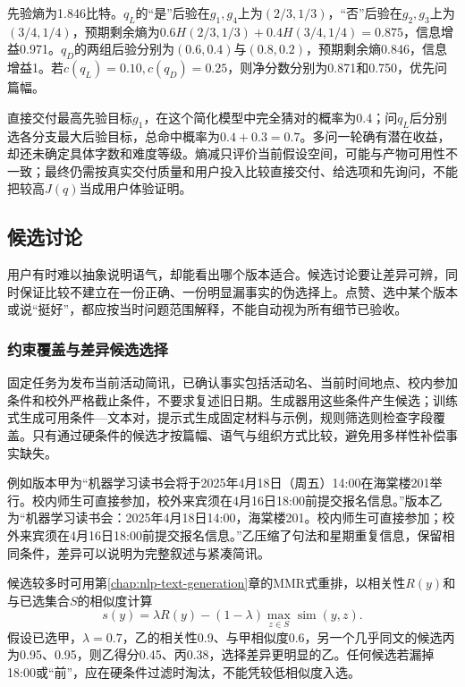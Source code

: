 先验熵为1.846比特。$q_L$的“是”后验在$g_1,g_4$上为$(2/3,1/3)$，“否”后验在$g_2,g_3$上为$(3/4,1/4)$，预期剩余熵为$0.6H(2/3,1/3)+0.4H(3/4,1/4)=0.875$，信息增益0.971。$q_D$的两组后验分别为$(0.6,0.4)$与$(0.8,0.2)$，预期剩余熵0.846，信息增益1。若$c(q_L)=0.10,c(q_D)=0.25$，则净分数分别为0.871和0.750，优先问篇幅。

直接交付最高先验目标$g_1$，在这个简化模型中完全猜对的概率为0.4；问$q_L$后分别选各分支最大后验目标，总命中概率为$0.4+0.3=0.7$。多问一轮确有潜在收益，却还未确定具体字数和难度等级。熵减只评价当前假设空间，可能与产物可用性不一致；最终仍需按真实交付质量和用户投入比较直接交付、给选项和先询问，不能把较高$J(q)$当成用户体验证明。

\subsection{候选讨论}
\label{sec:nlp-dialogue-candidates}

用户有时难以抽象说明语气，却能看出哪个版本适合。候选讨论要让差异可辨，同时保证比较不建立在一份正确、一份明显漏事实的伪选择上。点赞、选中某个版本或说“挺好”，都应按当时问题范围解释，不能自动视为所有细节已验收。

\subsubsection{约束覆盖与差异候选选择}
\label{sec:nlp-dialogue-diverse-candidates}

固定任务为发布当前活动简讯，已确认事实包括活动名、当前时间地点、校内参加条件和校外严格截止条件，不要求复述旧日期。生成器用这些条件产生候选；训练式生成可用条件—文本对，提示式生成固定材料与示例，规则筛选则检查字段覆盖。只有通过硬条件的候选才按篇幅、语气与组织方式比较，避免用多样性补偿事实缺失。

例如版本甲为“机器学习读书会将于2025年4月18日（周五）14:00在海棠楼201举行。校内师生可直接参加，校外来宾须在4月16日18:00前提交报名信息。”版本乙为“机器学习读书会：2025年4月18日14:00，海棠楼201。校内师生可直接参加；校外来宾须在4月16日18:00前提交报名信息。”乙压缩了句法和星期重复信息，保留相同条件，差异可以说明为完整叙述与紧凑简讯。

候选较多时可用第\ref{chap:nlp-text-generation}章的MMR式重排，以相关性$R(y)$和与已选集合$S$的相似度计算
\begin{equation}
 s(y)=\lambda R(y)-(1-\lambda)\max_{z\in S}\operatorname{sim}(y,z).
 \label{eq:nlp-dialogue-mmr}
\end{equation}
假设已选甲，$\lambda=0.7$，乙的相关性0.9、与甲相似度0.6，另一个几乎同文的候选丙为0.95、0.95，则乙得分0.45、丙0.38，选择差异更明显的乙。任何候选若漏掉18:00或“前”，应在硬条件过滤时淘汰，不能凭较低相似度入选。

